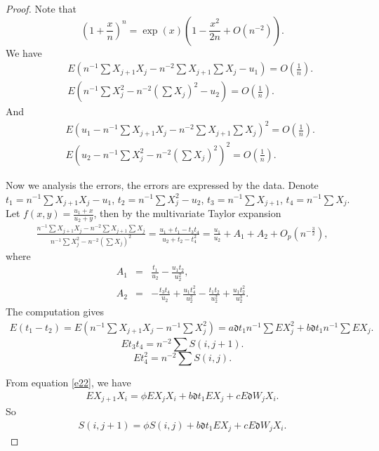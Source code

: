 \documentclass[12pt,reqno, a4paper]{article}
\numberwithin{equation}{section}
\begin{document}
\begin{proof}
Note that
$$(1+\frac x n)^n=\exp(x)(1-\frac {x^2}{2n}+O(n^{-2})).$$
We have
 \begin{eqnarray*}
&&E(n^{-1}\sum  X_{j+1}X_j-n^{-2}\sum X_{j+1} \sum X_j-u_1)=O(\frac 1 n).\\
&&E(n^{-1}\sum X_j^2-n^{-2}(\sum X_j)^2-u_2)=O(\frac 1 n).
\end{eqnarray*}
And
 \begin{eqnarray*}
&&E(u_1-n^{-1}\sum  X_{j+1}X_j-n^{-2}\sum X_{j+1} \sum X_j)^2=O(\frac 1 n).\\
&&E(u_2-n^{-1}\sum X_j^2-n^{-2}(\sum X_j)^2)^2=O(\frac 1 n).
\end{eqnarray*}

Now we analysis the errors, the errors are expressed by the data. Denote $t_1=n^{-1}\sum X_{j+1}X_j-u_1$, $t_2=n^{-1}\sum X_j^2-u_2$, $t_3=n^{-1}\sum X_{j+1}$, $t_4=n^{-1}\sum X_{j}$. Let $f(x,y)=\frac {u_1+x}{u_2+y}$,  then by the multivariate Taylor expansion
 \begin{eqnarray*}\label{a1}
 \frac {n^{-1}\sum X_{j+1}X_j-n^{-2}\sum X_{j+1} \sum X_j}{n^{-1}\sum X_j^2-n^{-2}(\sum X_j)^2}=\frac {u_1+t_1-t_3t_4} {u_2+t_2-t_4^2}=\frac {u_1}{u_2}+A_1+A_2+O_p(n^{-\frac 3 2}),
\end{eqnarray*}
 where  \begin{eqnarray*}A_1&=&\frac{t_1}{u_2}-\frac {u_1t_2}{u_2^2},\\ A_2&=&-\frac {t_3t_4}{u_2}+\frac {u_1t_4^2}{u_2^2}-\frac {t_1t_2}{u_2^2}+\frac {u_1t_2^2}{u_2^3}.\end{eqnarray*}
 The computation gives
 \begin{eqnarray*}
  E(t_1-t_2)=E(n^{-1}\sum X_{j+1}X_j-n^{-1}\sum X_j^2)=a\mathfrak{d} t_1n^{-1}\sum EX_j^2+b\mathfrak{d} t_1n^{-1}\sum EX_j.
 \end{eqnarray*}
 $$Et_3t_4={n^{-2}}\sum S(i,j+1).$$
 $$Et_4^2= {n^{-2}}\sum S(i,j).$$

   From equation \eqref{e22}, we have
   \begin{eqnarray*}
   EX_{j+1}X_i=\phi EX_jX_i+b\mathfrak{d} t_1E X_j+cE\mathfrak{d} W_j X_i.
 \end{eqnarray*}
 So
    \begin{eqnarray*}
 S(i,j+1)=\phi S(i,j)+b\mathfrak{d} t_1E X_j+cE\mathfrak{d} W_j X_i.
 \end{eqnarray*}


\end{proof}
\end{document}
